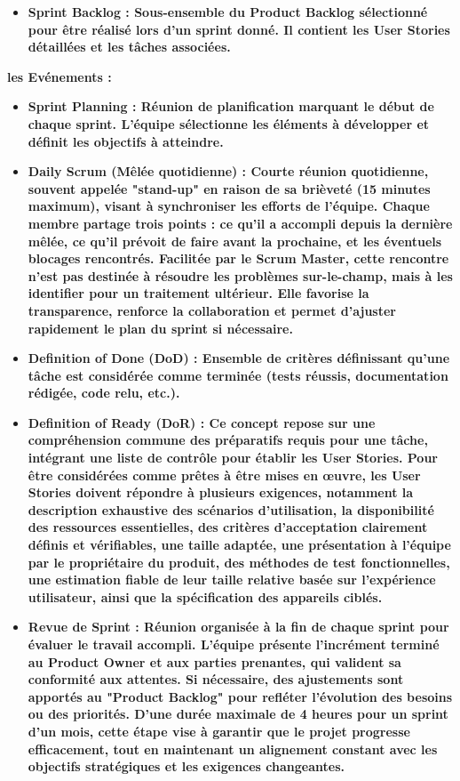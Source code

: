 {\begin{itemize}
\item \noindent \bfseries Sprint Backlog  \mdseries : Sous-ensemble du Product Backlog sélectionné pour être réalisé lors d’un sprint donné. Il contient les User Stories détaillées et les tâches associées.
\end{itemize}
\newpage
\noindent \bfseries les Evénements \mdseries : 
\begin{itemize}
\item \noindent \bfseries Sprint Planning  \mdseries : Réunion de planification marquant le début de chaque sprint. L’équipe sélectionne les éléments à développer et définit les objectifs à atteindre.
\item \noindent \bfseries Daily Scrum (Mêlée quotidienne)  \mdseries : Courte réunion quotidienne, souvent appelée "stand-up" en raison de sa brièveté (15 minutes maximum), visant à synchroniser les efforts de l’équipe. Chaque membre partage trois points : ce qu’il a accompli depuis la dernière mêlée, ce qu’il prévoit de faire avant la prochaine, et les éventuels blocages rencontrés. Facilitée par le Scrum Master, cette rencontre n’est pas destinée à résoudre les problèmes sur-le-champ, mais à les identifier pour un traitement ultérieur. Elle favorise la transparence, renforce la collaboration et permet d’ajuster rapidement le plan du sprint si nécessaire.
\item \noindent \bfseries Definition of Done (DoD) \mdseries :
Ensemble de critères définissant qu’une tâche est considérée comme terminée (tests réussis, documentation rédigée, code relu, etc.).
\item \noindent \bfseries Definition of Ready (DoR) \mdseries :
Ce concept repose sur une compréhension commune des préparatifs requis pour une tâche, intégrant une liste de contrôle pour établir les User Stories. Pour être considérées comme prêtes à être mises en œuvre, les User Stories doivent répondre à plusieurs exigences, notamment la description exhaustive des scénarios d'utilisation, la disponibilité des ressources essentielles, des critères d'acceptation clairement définis et vérifiables, une taille adaptée, une présentation à l'équipe par le propriétaire du produit, des méthodes de test fonctionnelles, une estimation fiable de leur taille relative basée sur l'expérience utilisateur, ainsi que la spécification des appareils ciblés.

\item \noindent \bfseries Revue de Sprint  \mdseries : Réunion organisée à la fin de chaque sprint pour évaluer le travail accompli. L’équipe présente l’incrément terminé au Product Owner et aux parties prenantes, qui valident sa conformité aux attentes. Si nécessaire, des ajustements sont apportés au "Product Backlog" pour refléter l’évolution des besoins ou des priorités. D’une durée maximale de 4 heures pour un sprint d’un mois, cette étape vise à garantir que le projet progresse efficacement, tout en maintenant un alignement constant avec les objectifs stratégiques et les exigences changeantes.


\end{itemize}}
